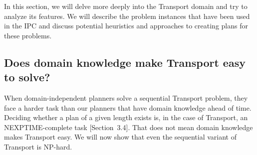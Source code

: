 In this section, we will delve more deeply into the Transport domain and try to analyze its features.
We will describe the problem instances that have been used in the IPC and discuss potential
heuristics and approaches to creating plans for these problems.


\subsection{Does domain knowledge make Transport easy to solve?}

When domain-independent planners solve a sequential Transport problem,
they face a harder task than our planners that have domain knowledge ahead of time.
Deciding whether a plan of a given length exists is, in the case of Transport,
an NEXPTIME-complete task \citep{Ghallab2004}[Section~3.4].
That does not mean domain knowledge makes Transport easy. We will now show
that even the sequential variant of Transport is NP-hard.

